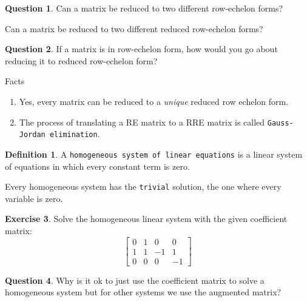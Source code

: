 \documentclass{beamer}
\theoremstyle{definition}
\newtheorem{exercise}{Exercise}
\newtheorem{question}[exercise]{Question}
\newtheorem*{defn}{Definition}
\renewcommand{\emph}[1]{{\color{blue}\texttt{#1}}}
\begin{document}
\begin{frame}{\insertframenumber}
	\begin{question}
		Can a matrix be reduced to two different row-echelon forms?
		
		Can a matrix be reduced to two different reduced row-echelon forms?
	\end{question}
	\begin{question}
		If a matrix is in row-echelon form, how would you go about reducing it to reduced row-echelon form?
	\end{question}
	\begin{block}{Facts}
		\begin{enumerate}[label=(\alph*)]
			\item Yes, every matrix can be reduced to a \textit{unique} reduced row echelon form.
			\item The process of translating a RE matrix to a RRE matrix is called \emph{Gauss-Jordan elimination}.
		\end{enumerate}
	\end{block}
\end{frame}

\begin{frame}{\insertframenumber}
	\begin{defn}
		A \emph{homogeneous system of linear equations} is a linear system of equations in which every constant term is zero.
		
		Every homogeneous system has the \emph{trivial} solution, the one where every variable is zero.
	\end{defn}
\end{frame}

\begin{frame}{\insertframenumber}
	\begin{exercise}
		Solve the homogeneous linear system with the given coefficient matrix:
		\[
		\left[\begin{array}{rrrr}
		0 & 1 & 0 & 0 \\
		1 & 1 & -1 & 1 \\
		0 & 0 & 0 & -1
		\end{array}\right]\]
	\end{exercise}
	\pause
	\begin{question}
		Why is it ok to just use the coefficient matrix to solve a homogeneous system but for other systems we use the augmented matrix?
	\end{question}
\end{frame}
\end{document}
